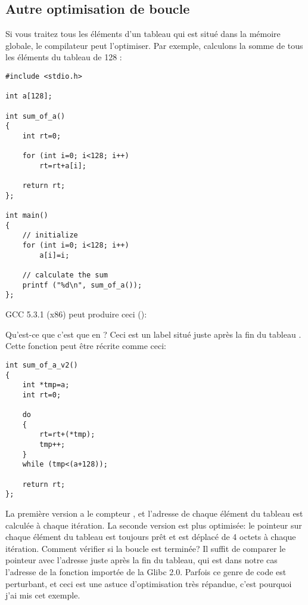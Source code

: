 \subsection{Autre optimisation de boucle}

Si vous traitez tous les éléments d'un tableau qui est situé dans la mémoire globale,
le compilateur peut l'optimiser.
Par exemple, calculons la somme de tous les éléments du tableau de 128 :

\begin{lstlisting}[style=customc]
#include <stdio.h>

int a[128];

int sum_of_a()
{
	int rt=0;
	
	for (int i=0; i<128; i++)
		rt=rt+a[i];

	return rt;
};

int main()
{
	// initialize
	for (int i=0; i<128; i++)
		a[i]=i;
	
	// calculate the sum
	printf ("%d\n", sum_of_a());
};
\end{lstlisting}

GCC 5.3.1 (x86) \Optimizing peut produire ceci (\IDA):



Qu'est-ce que c'est que  en ?
Ceci est un label situé juste après la fin du tableau .
Cette fonction peut être récrite comme ceci:

\begin{lstlisting}[style=customc]
int sum_of_a_v2()
{
	int *tmp=a;
	int rt=0;
	
	do
	{
		rt=rt+(*tmp);
		tmp++;
	}
	while (tmp<(a+128));

	return rt;
};
\end{lstlisting}

La première version a le compteur , et l'adresse de chaque élément du tableau
est calculée à chaque itération.
La seconde version est plus optimisée: le pointeur sur chaque élément du tableau
est toujours prêt et est déplacé de 4 octets à chaque itération.
Comment vérifier si la boucle est terminée?
Il suffit de comparer le pointeur avec l'adresse juste après la fin du tableau, qui
est dans notre cas l'adresse de la fonction  importée de la Glibc 2.0.
Parfois ce genre de code est perturbant, et ceci est une astuce d'optimisation très
répandue, c'est pourquoi j'ai mis cet exemple.

